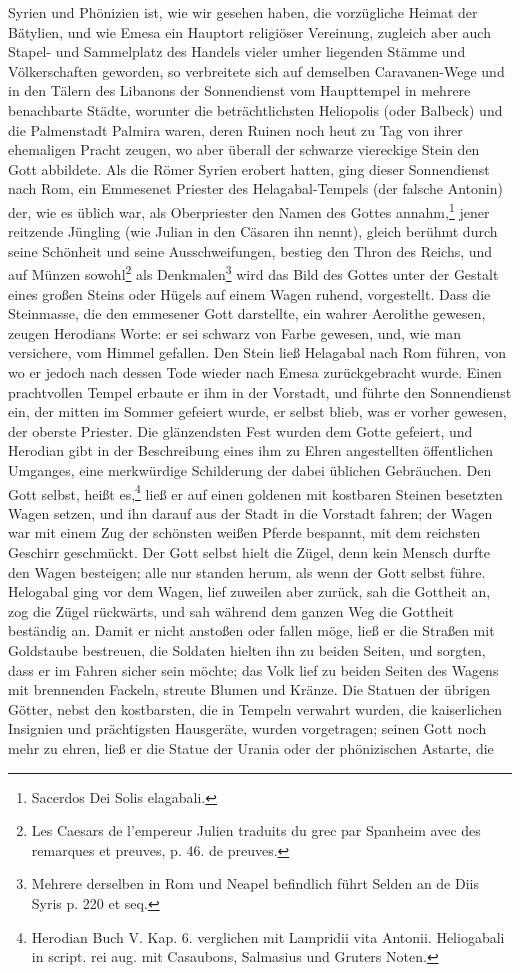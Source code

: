 \documentclass[a4paper, 11pt, oneside, polutonikogreek, german]{article}
\begin{document}
Syrien und Phönizien ist, wie wir gesehen haben, die vorzügliche Heimat der Bätylien, und wie Emesa ein Hauptort religiöser Vereinung, zugleich aber auch Stapel- und Sammelplatz des Handels vieler umher liegenden Stämme und Völkerschaften geworden, so verbreitete sich auf demselben Caravanen-Wege und in den Tälern des Libanons der Sonnendienst vom Haupttempel in mehrere benachbarte Städte, worunter die beträchtlichsten Heliopolis (oder Balbeck) und die Palmenstadt Palmira waren, deren Ruinen noch heut zu Tag von ihrer ehemaligen Pracht zeugen, wo aber überall der schwarze viereckige Stein den Gott abbildete. Als die Römer Syrien erobert hatten, ging dieser Sonnendienst nach Rom, ein Emmesenet Priester des Helagabal-Tempels (der falsche Antonin) der, wie es üblich war, als Oberpriester den Namen des Gottes annahm,\footnote{Sacerdos Dei Solis elagabali.} jener reitzende Jüngling (wie Julian in den Cäsaren ihn nennt), gleich berühmt durch seine Schönheit und seine Ausschweifungen, bestieg den Thron des Reichs, und auf Münzen sowohl\footnote{Les Caesars de l'empereur Julien traduits du grec par Spanheim avec des remarques et preuves, p. 46. de preuves.} als Denkmalen\footnote{Mehrere derselben in Rom und Neapel befindlich führt Selden an de Diis Syris p. 220 et seq.} wird das Bild des Gottes unter der Gestalt eines großen Steins oder Hügels auf einem Wagen ruhend, vorgestellt. Dass die Steinmasse, die den emmesener Gott darstellte, ein wahrer Aerolithe gewesen, zeugen Herodians Worte: er sei schwarz von Farbe gewesen, und, wie man versichere, vom Himmel gefallen. Den Stein ließ Helagabal nach Rom führen, von wo er jedoch nach dessen Tode wieder nach Emesa zurückgebracht wurde. Einen prachtvollen Tempel erbaute er ihm in der Vorstadt, und führte den Sonnendienst ein, der mitten im Sommer gefeiert wurde, er selbst blieb, was er vorher gewesen, der oberste Priester. Die glänzendsten Fest wurden dem Gotte gefeiert, und Herodian gibt in der Beschreibung eines ihm zu Ehren angestellten öffentlichen Umganges, eine merkwürdige Schilderung der dabei üblichen Gebräuchen. Den Gott selbst, heißt es,\footnote{Herodian Buch V. Kap. 6. verglichen mit Lampridii vita Antonii. Heliogabali in script. rei aug. mit Casaubons, Salmasius und Gruters Noten.} ließ er auf einen goldenen mit kostbaren Steinen besetzten Wagen setzen, und ihn darauf aus der Stadt in die Vorstadt fahren; der Wagen war mit einem Zug der schönsten weißen Pferde bespannt, mit dem reichsten Geschirr geschmückt. Der Gott selbst hielt die Zügel, denn kein Mensch durfte den Wagen besteigen; alle nur standen herum, als wenn der Gott selbst führe. Helogabal ging vor dem Wagen, lief zuweilen aber zurück, sah die Gottheit an, zog die Zügel rückwärts, und sah während dem ganzen Weg die Gottheit beständig an. Damit er nicht anstoßen oder fallen möge, ließ er die Straßen mit Goldstaube bestreuen, die Soldaten hielten ihn zu beiden Seiten, und sorgten, dass er im Fahren sicher sein möchte; das Volk lief zu beiden Seiten des Wagens mit brennenden Fackeln, streute Blumen und Kränze. Die Statuen der übrigen Götter, nebst den kostbarsten, die in Tempeln verwahrt wurden, die kaiserlichen Insignien und prächtigsten Hausgeräte, wurden vorgetragen; seinen Gott noch mehr zu ehren, ließ er die Statue der Urania oder der phönizischen Astarte, die 
\end{document}
